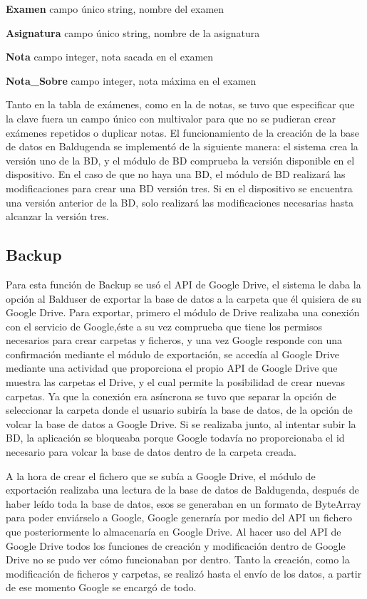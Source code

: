 \textbf{Examen} campo único string, nombre del examen

\textbf{Asignatura} campo único string, nombre de la asignatura

\textbf{Nota} campo integer, nota sacada en el examen

\textbf{Nota\_Sobre} campo integer, nota máxima en el examen


Tanto en la tabla de exámenes, como en la de notas, se tuvo que especificar que la clave fuera un campo único con multivalor para que no se pudieran crear exámenes repetidos o duplicar notas.
El funcionamiento de la creación de la base de datos en Baldugenda se implementó de la siguiente manera: el sistema crea la versión uno de la BD, y el módulo de BD comprueba la versión disponible en el dispositivo. En el caso de que no haya una BD, el módulo de BD realizará las modificaciones para crear una BD versión tres. Si en el dispositivo se encuentra una versión anterior de la BD, solo realizará las modificaciones necesarias hasta alcanzar la versión tres.


\subsection{Backup}
\label{subsecc:Backup}

Para esta función de Backup se usó el API de Google Drive, el sistema le daba la opción al Balduser de exportar la base de datos a la carpeta que él quisiera de su Google Drive.
Para exportar, primero el módulo de Drive realizaba una conexión con el servicio de Google,éste a su vez comprueba que tiene los permisos necesarios para crear carpetas y ficheros, y una vez Google responde con una confirmación mediante el módulo de exportación, se accedía al Google Drive mediante una actividad que proporciona el propio API de Google Drive que muestra las carpetas el Drive, y el cual permite la posibilidad de crear nuevas carpetas.
Ya que la conexión era asíncrona se tuvo que separar la opción de seleccionar la carpeta donde el usuario subiría la base de datos, de la opción de volcar la base de datos a Google Drive. Si se realizaba junto, al intentar subir la BD, la aplicación se bloqueaba porque Google todavía no proporcionaba el id necesario para volcar la base de datos dentro de la carpeta creada.

A la hora de crear el fichero que se subía a Google Drive, el módulo de exportación realizaba una lectura de la base de datos de Baldugenda, después de haber leído toda la base de datos, esos se generaban en un formato de ByteArray para poder enviárselo a Google, Google generaría por medio del API un fichero que posteriormente lo almacenaría en Google Drive. Al hacer uso del API de Google Drive todos los funciones de creación y modificación dentro de Google Drive no se pudo ver cómo funcionaban por dentro. Tanto la creación, como la modificación de ficheros y carpetas, se realizó hasta el envío de los datos, a partir de ese momento Google se encargó de todo.

